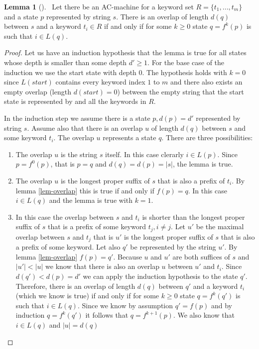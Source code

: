 \documentclass[english,twoside,censored,csm,algorithms-track-2020]{HYthesisML}
\theoremstyle{plain}
\theoremstyle{definition}
\newtheorem{lemma}[theorem]{Lemma}
\begin{document}


\begin{lemma}[] ~\label{lem-overlap-length}
  Let there be an AC-machine for a keyword set $R=\{t_1,...,t_m\}$ and a state $p$ represented
  by string $s$.
  There is an overlap of length $d(q)$ between $s$ and a keyword $t_i\in R$ if and only if
  for some $k \geq 0$ state $q=f^k(p)$ is such that $i\in L(q)$.
\end{lemma}
\begin{proof}
  Let us have an induction hypothesis that the lemma is true for all states whose depth is
  smaller than some depth $d'\geq 1$. For the base case of the induction we use the start state
  with depth 0. The hypothesis holds
  with $k=0$ since $L(start)$ contains every keyword index $1$ to $m$ and there also exists an empty
  overlap (length $d(start)=0$) between the empty string that the start state is represented by and all
  the keywords in $R$.

  In the induction step we assume there is a state $p, d(p) = d'$ represented by string $s$.
  Assume also that there is an overlap $u$ of length $d(q)$ between $s$ and some keyword $t_i$. The
  overlap $u$ represents a state $q$.
  There are three possibilities:
  \begin{enumerate}
  \item The overlap $u$ is the string $s$ itself. In this case clerarly $i\in L(p)$. Since
    $p=f^0(p)$, that is $p=q$ and $d(q) = d(p) = |s|$, the lemma is true. 
  \item The overlap $u$ is the longest proper suffix of $s$ that is also a prefix of $t_i$.
    By lemma \ref{lem-overlap} this is true if and only if $f(p) = q$. In this case
    $i\in L(q)$ and the lemma is true with $k=1$.
  \item In this case the overlap between $s$ and $t_i$ is shorter than the longest proper
    suffix of $s$ that is a prefix of some keyword $t_j, i\neq j$. Let $u'$ be the maximal
    overlap between $s$ and $t_j$ that is $u'$ is the longest proper suffix of $s$ that is also
    a prefix of some keyword. Let also $q'$ be represented by the string $u'$. By lemma
    \ref{lem-overlap} $f(p) = q'$. Because $u$ and $u'$ are both suffices of $s$ and $|u'|<|u|$ we
    know that there is also an overlap $u$ between $u'$ and $t_i$. Since $d(q') < d(p) = d'$ we can
    apply the induction hypothesis to the state $q'$. Therefore, there is an overlap of length
    $d(q)$ between $q'$ and a keyword $t_i$ (which we know is true) if and only if for some
    $k \geq 0$ state $q=f^k(q')$ is such that $i\in L(q)$. Since we know by assumption $q'=f(p)$ and
    by induction $q=f^k(q')$ it follows that $q=f^{k+1}(p)$. We also know that $i\in L(q)$ and
    $|u|=d(q)$

  \end{enumerate}
  
\end{proof}
\end{document}
